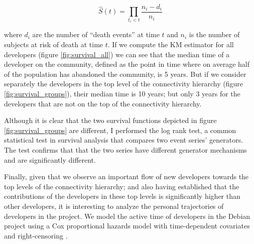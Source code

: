 $$
\hat{S}(t) = \prod_{t_i < t} \frac{n_i - d_i}{n_i}
$$

where $d_i$ are the number of ``death events'' at time $t$ and $n_i$ is the number of subjects at risk of death at time $t$. If we compute the KM estimator for all developers (figure \ref{fig:survival_all}) we can see that the median time of a developer on the community, defined as the point in time where on average half of the population has abandoned the community, is 5 years. But if we consider separately the developers in the top level of the connectivity hierarchy (figure \ref{fig:survival_groups}), their median time is 10 years; but only 3 years for the developers that are not on the top of the connectivity hierarchy.

Although it is clear that the two survival functions depicted in figure \ref{fig:survival_groups} are different, I performed the log rank test, a common statistical test in survival analysis that compares two event series' generators. The test confirms that that the two series have different generator mechanisms and are significantly different.

Finally, given that we observe an important flow of new developers towards the top levels of the connectivity hierarchy; and also having established that the contributions of the developers in these top levels is significantly higher than other developers, it is interesting to analyze the personal trajectories of developers in the project. We model the active time of developers in the Debian project using a Cox proportional hazards model with time-dependent covariates and right-censoring \citep[appendix on survival analysis]{fox:2002}.


